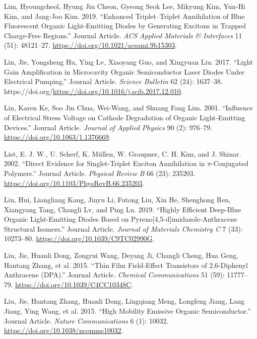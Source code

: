 \documentclass[
  letterpaper,
  DIV=11,
  numbers=noendperiod,
  oneside]{scrreprt}
\newlength{\cslhangindent}
\newlength{\cslentryspacingunit} %
\newenvironment{CSLReferences}[2] %
 {%
  \setlength{\parindent}{0pt}
  \ifodd #1
  \let\oldpar\par
  \def\par{\hangindent=\cslhangindent\oldpar}
  \fi
  \setlength{\parskip}{#2\cslentryspacingunit}
 }%
 {}
\begin{document}
\begin{CSLReferences}{1}{0}
\leavevmode{}%
Lim, Hyoungcheol, Hyung Jin Cheon, Gyeong Seok Lee, Mikyung Kim, Yun-Hi
Kim, and Jang-Joo Kim. 2019. {``Enhanced Triplet--Triplet Annihilation
of Blue Fluorescent Organic Light-Emitting Diodes by Generating Excitons
in Trapped Charge-Free Regions.''} Journal Article. \emph{ACS Applied
Materials \& Interfaces} 11 (51): 48121--27.
\url{https://doi.org/10.1021/acsami.9b15303}.

\leavevmode{}%
Lin, Jie, Yongsheng Hu, Ying Lv, Xiaoyang Guo, and Xingyuan Liu. 2017.
{``Light Gain Amplification in Microcavity Organic Semiconductor Laser
Diodes Under Electrical Pumping.''} Journal Article. \emph{Science
Bulletin} 62 (24): 1637--38.
https://doi.org/\url{https://doi.org/10.1016/j.scib.2017.12.010}.

\leavevmode{}%
Lin, Karen Ke, Soo Jin Chua, Wei-Wang, and Shuang Fang Lim. 2001.
{``Influence of Electrical Stress Voltage on Cathode Degradation of
Organic Light-Emitting Devices.''} Journal Article. \emph{Journal of
Applied Physics} 90 (2): 976--79.
\url{https://doi.org/10.1063/1.1376669}.

\leavevmode{}%
List, E. J. W., U. Scherf, K. Müllen, W. Graupner, C. H. Kim, and J.
Shinar. 2002. {``Direct Evidence for Singlet-Triplet Exciton
Annihilation in \(\pi\)-Conjugated Polymers.''} Journal Article.
\emph{Physical Review B} 66 (23): 235203.
\url{https://doi.org/10.1103/PhysRevB.66.235203}.

\leavevmode{}%
Liu, Hui, Liangliang Kang, Jinyu Li, Futong Liu, Xin He, Shenghong Ren,
Xiangyang Tang, Changli Lv, and Ping Lu. 2019. {``Highly Efficient
Deep-Blue Organic Light-Emitting Diodes Based on
Pyreno{[}4,5-d{]}imidazole-Anthracene Structural Isomers.''} Journal
Article. \emph{Journal of Materials Chemistry C} 7 (33): 10273--80.
\url{https://doi.org/10.1039/C9TC02990G}.

\leavevmode{}%
Liu, Jie, Huanli Dong, Zongrui Wang, Deyang Ji, Changli Cheng, Hua Geng,
Hantang Zhang, et al. 2015. {``Thin Film Field-Effect Transistors of
2,6-Diphenyl Anthracene (DPA).''} Journal Article. \emph{Chemical
Communications} 51 (59): 11777--79.
\url{https://doi.org/10.1039/C4CC10348C}.

\leavevmode{}%
Liu, Jie, Hantang Zhang, Huanli Dong, Lingqiang Meng, Longfeng Jiang,
Lang Jiang, Ying Wang, et al. 2015. {``High Mobility Emissive Organic
Semiconductor.''} Journal Article. \emph{Nature Communications} 6 (1):
10032. \url{https://doi.org/10.1038/ncomms10032}.


\end{CSLReferences}
\end{document}
